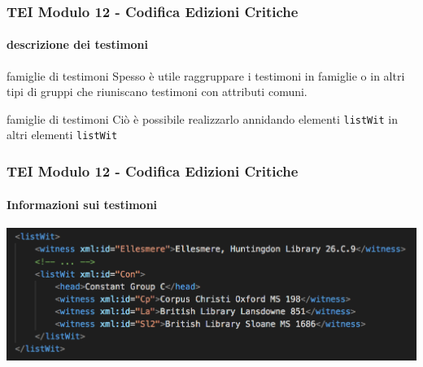 \begin{frame}
    \frametitle{TEI Modulo 12 - Codifica Edizioni Critiche}
    \framesubtitle{descrizione dei testimoni}
    \addtocounter{nframe}{1}




    
    \begin{block}{famiglie di testimoni}
        Spesso è utile raggruppare i testimoni in famiglie o in altri tipi di gruppi che riuniscano testimoni con attributi comuni.
    \end{block}
    \begin{block}{famiglie di testimoni}
        Ciò è possibile realizzarlo annidando elementi \texttt{listWit} in altri elementi \texttt{listWit}
    \end{block}
   
\end{frame}


\begin{frame}
    \frametitle{TEI Modulo 12 - Codifica Edizioni Critiche}
    \framesubtitle{Informazioni sui testimoni}
    \addtocounter{nframe}{1}
    
    \begin{center}
        \includegraphics[width=.95\textwidth]{imgs/listWit-nest.png}
    \end{center}


\end{frame}


